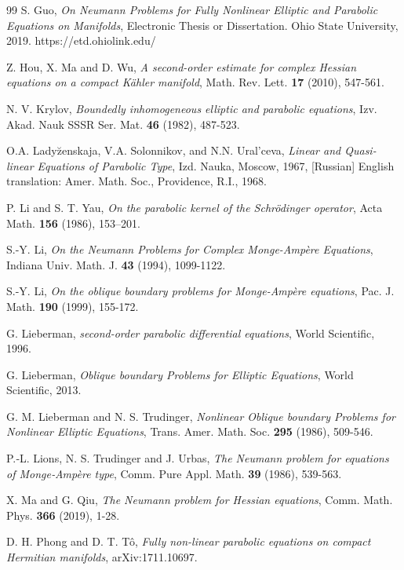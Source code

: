 \documentclass[12pt]{amsart}
\theoremstyle{definition}
\theoremstyle{remark}
\numberwithin{equation}{section}
\begin{document}
\begin{thebibliography}{99}
	S. Guo,
	{\em On Neumann Problems for Fully Nonlinear Elliptic and Parabolic Equations on Manifolds},
	Electronic Thesis or Dissertation. Ohio State University, 2019. https://etd.ohiolink.edu/
	
	Z. Hou, X. Ma and D. Wu,
	{\em A second-order estimate for complex Hessian equations on a compact Kähler manifold},
	{Math. Rev. Lett.} {\bf 17} (2010), 547-561.
		
	N. V. Krylov, 
	{\em Boundedly inhomogeneous elliptic and parabolic equations},
	{Izv. Akad. Nauk SSSR Ser. Mat.}  {\bf 46} (1982), 487-523.
	
	O.A. Lady\u{z}enskaja, V.A. Solonnikov, and N.N. Ural'ceva,
	{\em Linear and Quasi-linear Equations of Parabolic Type},
	Izd. Nauka, Moscow, 1967, [Russian] English translation: Amer. Math. Soc., Providence, R.I., 1968. 
	
	P. Li and S. T. Yau,
	{\em On the parabolic kernel of the Schr\"{o}dinger operator},
	{Acta Math.} {\bf 156} (1986), 153–201.
	
	S.-Y. Li,
	{\em On the Neumann Problems for Complex Monge-Amp\`ere Equations},
	{Indiana Univ. Math. J.} {\bf 43} (1994), 1099-1122.
	
	S.-Y. Li,
	{\em On the oblique boundary problems for Monge-Amp\`ere equations},
	{Pac. J. Math.} {\bf 190} (1999), 155-172.
	
	G. Lieberman,
	{\em second-order parabolic differential equations},
	World Scientific, 1996.
	
	G. Lieberman,
	{\em Oblique boundary Problems for Elliptic Equations},
	World Scientific, 2013.
	
	G. M. Lieberman and N. S. Trudinger,
	{\em Nonlinear Oblique boundary Problems for Nonlinear Elliptic Equations},
	{Trans. Amer. Math. Soc.} {\bf 295} (1986), 509-546.
	
	P.‐L. Lions, N. S. Trudinger and  J. Urbas,
	{\em The Neumann problem for equations of Monge‐Amp\`ere type},
	{Comm. Pure Appl. Math.} {\bf 39} (1986), 539-563.
	
	X. Ma and G. Qiu, 
	{\em The Neumann problem for Hessian equations},
	{Comm. Math. Phys.}  {\bf 366} (2019), 1-28.
	
	D. H. Phong and D. T. T\^o,
	{\em Fully non-linear parabolic equations on compact Hermitian manifolds},
	arXiv:1711.10697.
	

\end{thebibliography}
\end{document}
